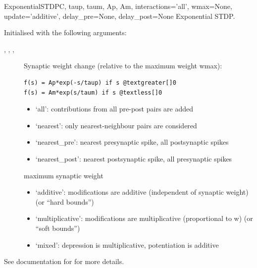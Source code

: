 \documentclass[letterpaper,10pt,english]{manual}
\begin{document}
\hypertarget{brian.ExponentialSTDP}{}\begin{classdesc}{ExponentialSTDP}{C, taup, taum, Ap, Am, interactions='all', wmax=None, update='additive', delay\_pre=None, delay\_post=None}
Exponential STDP.

Initialised with the following arguments:
\begin{description}
\item[, , , ]
Synaptic weight change (relative to the maximum weight wmax):

\begin{Verbatim}[commandchars=@\[\]]
f(s) = Ap*exp(-s/taup) if s @textgreater[]0
f(s) = Am*exp(s/taum) if s @textless[]0
\end{Verbatim}

\item[]\begin{itemize}
\item {} 
`all': contributions from all pre-post pairs are added

\item {} 
`nearest': only nearest-neighbour pairs are considered

\item {} 
`nearest\_pre': nearest presynaptic spike, all postsynaptic spikes

\item {} 
`nearest\_post': nearest postsynaptic spike, all presynaptic spikes

\end{itemize}

\item[]
maximum synaptic weight

\item[]\begin{itemize}
\item {} 
`additive': modifications are additive (independent of synaptic weight)
(or ``hard bounds'')

\item {} 
`multiplicative': modifications are multiplicative (proportional to w)
(or ``soft bounds'')

\item {} 
`mixed': depression is multiplicative, potentiation is additive

\end{itemize}

\end{description}

See documentation for \hyperlink{brian.STDP}{} for more details.
\end{classdesc}
\end{document}
